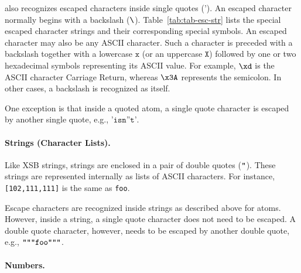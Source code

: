 \documentclass[11pt]{report}
\begin{document}
\FLORA also recognizes escaped characters inside single quotes
($\texttt{'}$).  An escaped character normally begins with a backslash
($\texttt{\bksl}$).  Table~\ref{tab:tab-esc-str} lists the special escaped
character strings and their corresponding special symbols. An escaped
character may also be any ASCII character. Such a character is preceded
with a backslash together with a lowercase $\texttt{x}$ (or an uppercase
$\texttt{X}$) followed by one or two hexadecimal symbols representing its
ASCII value. For example, $\texttt{{\bksl}xd}$ is the ASCII character
Carriage Return, whereas $\texttt{{\bksl}x3A}$ represents the semicolon. In
other cases, a backslash is recognized as itself.

One exception is that inside a quoted atom, a single quote character is escaped by another
single quote, e.g., $\texttt{'isn''t'}$.

\paragraph{Strings (Character Lists).}

Like XSB strings, \FLORA strings are enclosed in a pair of double quotes
($\texttt{{\dq}}$).  These strings are represented internally as lists of
ASCII characters. For instance, \mbox{\texttt{[102,111,111]}} is the same
as \texttt{{\dq}foo{\dq}}.

Escape characters are recognized inside \FLORA strings as described above
for \FLORA atoms.  However, inside a string, a single quote character does
not need to be escaped. A double quote character, however, needs to be
escaped by another double quote, e.g.,
$\texttt{{\dq}{\dq}{\dq}foo{\dq}{\dq}{\dq}}$.

\paragraph{Numbers.}
\end{document}

